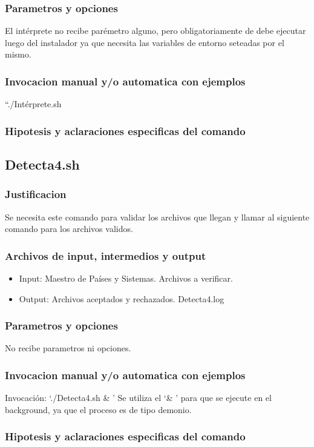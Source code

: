 \documentclass{article}
\begin{document}
		\subsubsection{Parametros y opciones}
		El intérprete no recibe parémetro alguno, pero obligatoriamente de debe ejecutar luego del instalador ya que necesita las variables de entorno seteadas por el mismo.
		\subsubsection{Invocacion manual y/o automatica con ejemplos}
		``./Intérprete.sh 
		\subsubsection{Hipotesis y aclaraciones especificas del comando}
	
	\subsection{Detecta4.sh}
	
		\subsubsection{Justificacion}
		Se necesita este comando para validar los archivos que llegan y llamar al siguiente comando para los archivos validos.
		\subsubsection{Archivos de input, intermedios y output}
		\begin{itemize}
			\item Input: Maestro de Países y Sistemas. Archivos a verificar.
			\item Output: Archivos aceptados y rechazados. Detecta4.log
		\end{itemize}
		\subsubsection{Parametros y opciones}
		No recibe parametros ni opciones.
		\subsubsection{Invocacion manual y/o automatica con ejemplos}
		Invocación: `./Detecta4.sh \& '
		Se utiliza el `\& ' para que se ejecute en el background, ya que el proceso es de tipo demonio.
		\subsubsection{Hipotesis y aclaraciones especificas del comando}
	
\end{document}
